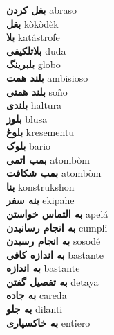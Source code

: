 \textbf{ بغل کردن  } abraso \\
\textbf{ بغل  } kòkòdèk \\
\textbf{ بلا  } katástrofe \\
\textbf{ بلاتلکیفی  } duda \\
\textbf{ بلبرینگ  } globo \\
\textbf{ بلند همت  } ambisioso \\
\textbf{ بلند همتی  } soño \\
\textbf{ بلندی  } haltura \\
\textbf{ بلوز  } blusa \\
\textbf{ بلوغ  } kresementu \\
\textbf{ بلوک  } bario \\
\textbf{ بمب اتمی  } atombòm \\
\textbf{ بمب شکافت  } atombòm \\
\textbf{ بنا  } konstrukshon \\
\textbf{ بنه سفر  } ekipahe \\
\textbf{ به التماس خواستن  } apelá \\
\textbf{ به انجام رسانیدن  } cumpli \\
\textbf{ به انجام رسیدن  } sosodé \\
\textbf{ به اندازه کافی  } bastante \\
\textbf{ به اندازه  } bastante \\
\textbf{ به تفصیل گفتن  } detaya \\
\textbf{ به جاده  } careda \\
\textbf{ به جلو  } dilanti \\
\textbf{ به خاکسپاری  } entiero \\
